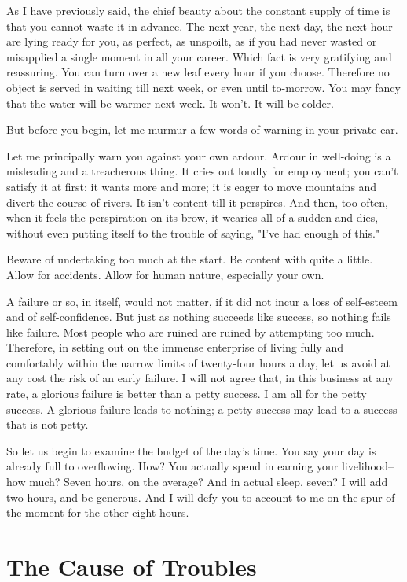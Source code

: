As I have previously said, the chief beauty about the constant supply
of time is that you cannot waste it in advance.  The next year, the
next day, the next hour are lying ready for you, as perfect, as
unspoilt, as if you had never wasted or misapplied a single moment in
all your career.  Which fact is very gratifying and reassuring.  You
can turn over a new leaf every hour if you choose. Therefore no object
is served in waiting till next week, or even until to-morrow.  You may
fancy that the water will be warmer next week.  It won't.  It will be
colder.

But before you begin, let me murmur a few words of warning in your
private ear.

Let me principally warn you against your own ardour.  Ardour in
well-doing is a misleading and a treacherous thing.  It cries out
loudly for employment; you can't satisfy it at first; it wants more and
more; it is eager to move mountains and divert the course of rivers.
It isn't content till it perspires. And then, too often, when it feels
the perspiration on its brow, it wearies all of a sudden and dies,
without even putting itself to the trouble of saying, "I've had enough
of this."

Beware of undertaking too much at the start.  Be content with quite a
little. Allow for accidents.  Allow for human nature, especially your
own.

A failure or so, in itself, would not matter, if it did not incur a
loss of self-esteem and of self-confidence.  But just as nothing
succeeds like success, so nothing fails like failure.  Most people who
are ruined are ruined by attempting too much.  Therefore, in setting
out on the immense enterprise of living fully and comfortably within
the narrow limits of twenty-four hours a day, let us avoid at any cost
the risk of an early failure.  I will not agree that, in this business
at any rate, a glorious failure is better than a petty success.  I am
all for the petty success.  A glorious failure leads to nothing; a
petty success may lead to a success that is not petty.

So let us begin to examine the budget of the day's time. You say your
day is already full to overflowing.  How?  You actually spend in
earning your livelihood--how much?  Seven hours, on the average? And in
actual sleep, seven?  I will add two hours, and be generous. And I will
defy you to account to me on the spur of the moment for the other eight
hours.


\addtocounter{chapter}{1}\chapter*{The Cause of Troubles}

